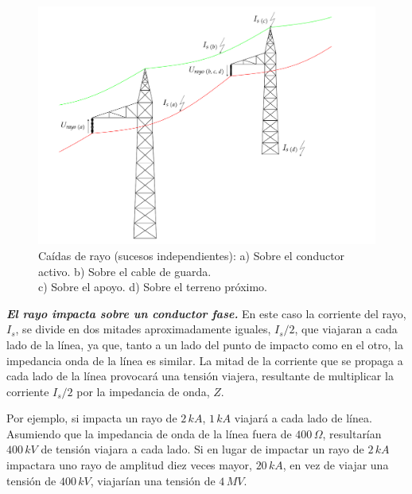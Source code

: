             \begin{figure}[H]
                \centering
                \includegraphics[scale=0.5]{capitulos/tema1/apoyoRayo/apoyoRayo.pdf}
                \caption{Caídas de rayo (sucesos independientes): a) Sobre el conductor activo. b) Sobre el cable de guarda.\\c) Sobre el apoyo. d) Sobre el terreno próximo.}
                \label{fig:caidaRayo}
            \end{figure}

            \textbf{\textit{El rayo impacta sobre un conductor fase.}} En este caso la corriente del rayo, $I_\textit{s}$, se divide en dos mitades aproximadamente iguales, $I_\textit{s}/2$, que viajaran a cada lado de la línea, ya que, tanto a un lado del punto de impacto como en el otro, la impedancia onda de la línea es similar. La mitad de la corriente que se propaga a cada lado de la línea provocará una tensión viajera, resultante de multiplicar la corriente $I_\textit{s}/2$ por la impedancia de onda, $Z$.\newline
            
            Por ejemplo, si impacta un rayo de $2\,\textit{kA}$, $1\,\textit{kA}$ viajará a cada lado de línea. Asumiendo que la impedancia de onda de la línea fuera de $400\,\Omega$, resultarían $400\,\textit{kV}$ de tensión viajara a cada lado. Si en lugar de impactar un rayo de $2\,\textit{kA}$ impactara uno rayo de amplitud diez veces mayor, $20\,\textit{kA}$, en vez de viajar una tensión de $400\,\textit{kV}$, viajarían una tensión de $4\,\textit{MV}$.\newline
            
